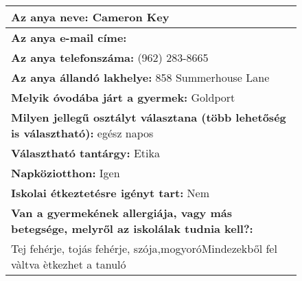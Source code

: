 \documentclass[10pt,a4paper]{article}
\begin{document}
\begin{figure}[!ht]
\begin{tabular}{|m{\textwidth}|}
\hline\vspace{3pt}
\textbf{Az anya neve:} \hspace{0.5cm} Cameron Key \vspace{3pt} \\
\hline\vspace{3pt}
\textbf{Az anya e-mail címe:} \hspace{0.5cm}   \vspace{3pt} \\
\hline\vspace{3pt}
\textbf{Az anya telefonszáma:} \hspace{0.5cm} (962) 283-8665 \vspace{3pt} \\
\hline\vspace{3pt}
\textbf{Az anya állandó lakhelye:} \hspace{0.5cm} 858 Summerhouse Lane \vspace{3pt} \\
\hline\vspace{3pt}
\textbf{Melyik óvodába járt a gyermek:} \hspace{0.5cm} Goldport \vspace{3pt} \\
\hline\vspace{3pt}
\textbf{Milyen jellegű osztályt választana (több lehetőség is választható):} \hspace{0.5cm} egész napos \vspace{3pt} \\
\hline\vspace{3pt}
\textbf{Választható tantárgy:} \hspace{0.5cm} Etika \vspace{3pt} \\
\hline\vspace{3pt}
\textbf{Napköziotthon:} \hspace{0.5cm} Igen \vspace{3pt} \\
\hline\vspace{3pt}
\textbf{Iskolai étkeztetésre igényt tart:} \hspace{0.5cm} Nem \vspace{3pt} \\
\hline\vspace{3pt}
\textbf{Van a gyermekének allergiája, vagy más betegsége, melyről az iskolálak tudnia kell?:} \\ \hspace{0.5cm} Tej fehérje, tojás fehérje, szója,mogyoróMindezekből fel vàltva ètkezhet a tanuló \vspace{3pt} \\

\end{tabular}
\end{figure}
\end{document}
